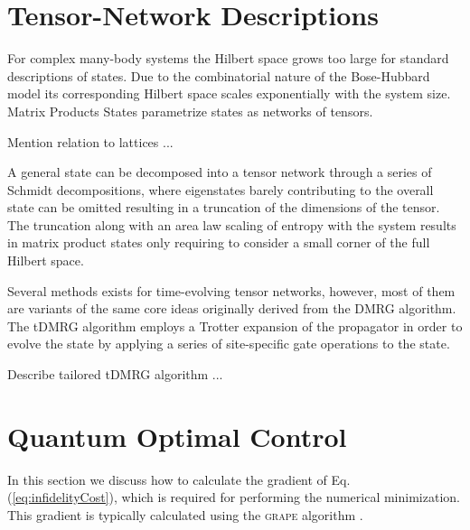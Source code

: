 \section{Tensor-Network Descriptions}
For complex many-body systems the Hilbert space grows too large for standard descriptions of states. Due to the combinatorial nature of the Bose-Hubbard model its corresponding Hilbert space scales exponentially with the system size. Matrix Products States parametrize states as networks of tensors.

Mention relation to lattices ...

A general state can be decomposed into a tensor network through a series of Schmidt decompositions, where eigenstates barely contributing to the overall state can be omitted resulting in a truncation of the dimensions of the tensor. The truncation along with an area law scaling of entropy with the system results in matrix product states only requiring to consider a small corner of the full Hilbert space.

Several methods exists for time-evolving tensor networks, however, most of them are variants of the same core ideas originally derived from the DMRG algorithm. The tDMRG algorithm employs a Trotter expansion of the propagator in order to evolve the state by applying a series of site-specific gate operations to the state.

Describe tailored tDMRG algorithm ...

\section{Quantum Optimal Control}
In this section we discuss how to calculate the gradient of Eq. (\ref{eq:infidelityCost}), which is required for performing the numerical minimization. This gradient is typically calculated using the \textsc{grape} algorithm \cite{khaneja2005optimal}.

